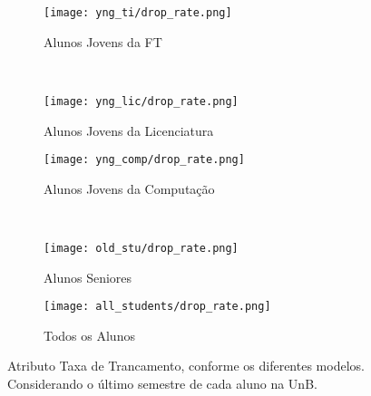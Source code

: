 \clearpage
\begin{figure}[!ht]
    \centering
    \begin{subfigure}[b]{0.48\textwidth}
        \centering
        \texttt{[image: yng\_ti/drop\_rate.png]}
        \caption{Alunos Jovens da FT}
    \end{subfigure}
    ~
    \begin{subfigure}[b]{0.48\textwidth}
        \centering
        \texttt{[image: yng\_lic/drop\_rate.png]}
        \caption{Alunos Jovens da Licenciatura}
    \end{subfigure}

    \begin{subfigure}[b]{0.48\textwidth}
        \centering
        \texttt{[image: yng\_comp/drop\_rate.png]}
        \caption{Alunos Jovens da Computação}
    \end{subfigure}
    ~
    \begin{subfigure}[b]{0.48\textwidth}
        \centering
        \texttt{[image: old\_stu/drop\_rate.png]}
        \caption{Alunos Seniores}
    \end{subfigure}

    \begin{subfigure}[b]{0.48\textwidth}
        \centering
        \texttt{[image: all\_students/drop\_rate.png]}
        \caption{Todos os Alunos}
    \end{subfigure}
    \caption{Atributo Taxa de Trancamento, conforme os diferentes modelos.
    Considerando o último semestre de cada aluno na UnB.}
\end{figure}

